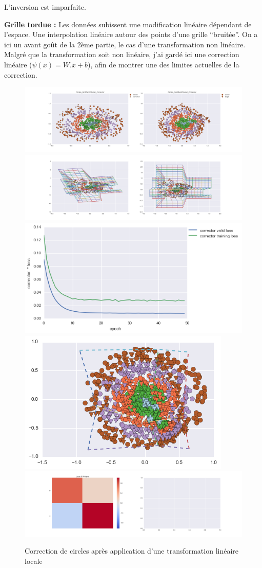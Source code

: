 L'inversion est imparfaite.


{\Large \textbf{Grille tordue :}} Les données subissent une modification linéaire dépendant de l'espace.
Une interpolation linéaire autour des points d'une grille ``bruitée''.
On a ici un avant goût de la 2ème partie, le cas d'une transformation non linéaire.
Malgré que la transformation soit non linéaire, j'ai gardé ici une correction linéaire ($\psi(x) = W.x+b$),
afin de montrer une des limites actuelles de la correction.

\begin{figure}[H] %
\centering
\includegraphics[width=\linewidth]{fig/24-05-2016/circles/Circles_GridBendCluster_Corrector-DATA.png}
\includegraphics[width=\linewidth]{fig/24-05-2016/circles/Circles_GridBendCluster_Corrector-GridCheck.png}
\includegraphics[width=0.45\linewidth]{fig/24-05-2016/circles/Circles_GridBendCluster_Corrector-Learning_curve.png}
\includegraphics[width=0.45\linewidth]{fig/24-05-2016/circles/circles_grid.png}
\includegraphics[width=\linewidth]{fig/24-05-2016/circles/Circles_GridBendCluster_Corrector-W.png}
\caption{Correction de circles après application d'une transformation linéaire locale}
\label{fig:recap-circles-GridBend-cluster}
\end{figure}

